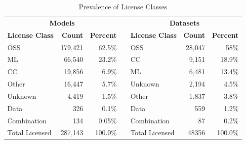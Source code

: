 \begin{table}[]
\caption{Prevalence of License Classes}
\label{tab:class_prevalence}
\begin{tabular}{lrrclrr}

\multicolumn{3}{c}{\textbf{Models}} & \textbf{} & \multicolumn{3}{c}{\textbf{Datasets}} \\
\cline{1-3} \cline{5-7}
\textbf{License Class} & \textbf{Count} & \textbf{Percent} & \textbf{} & \textbf{License Class} & \textbf{Count} & \textbf{Percent} \\ \cline{1-3} \cline{5-7} 
OSS & 179,421 & 62.5\% &  & OSS & 28,047 & 58\% \\
ML & 66,540 & 23.2\% &  & CC & 9,151 & 18.9\% \\
CC & 19,856 & 6.9\% &  & ML & 6,481 & 13.4\% \\
Other & 16,447 & 5.7\% &  & Unknown & 2,194 & 4.5\% \\
Unknown & 4,419 & 1.5\% &  & Other & 1,837 & 3.8\% \\
Data & 326 & 0.1\% &  & Data & 559 & 1.2\% \\
Combination & 134 & 0.05\% &  & Combination & 87 & 0.2\% \\ \cline{1-3} \cline{5-7} 
Total Licensed & 287,143 & 100.0\% &  & Total Licensed & 48356 & 100.0\% \\ \cline{1-3} \cline{5-7} 
\end{tabular}%
\end{table}
